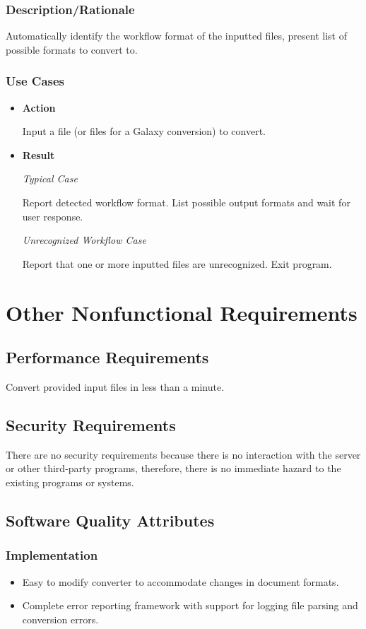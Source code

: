 \documentclass[12pt]{article}
\begin{document}
\subsubsection{Description/Rationale} Automatically identify the workflow format of the inputted files, present list of possible formats to convert to.

\subsubsection{Use Cases}
\begin{itemize}
\item \textbf{Action}

Input a file (or files for a Galaxy conversion) to convert.

\item \textbf{Result}

\textit{Typical Case}

Report detected workflow format. List possible output formats and wait for user response.

\textit{Unrecognized Workflow Case}

Report that one or more inputted files are unrecognized. Exit program.
\end{itemize}





\section{Other Nonfunctional Requirements}
\subsection{Performance Requirements}
Convert provided input files in less than a minute.

\subsection{Security Requirements}
There are no security requirements because there is no interaction with the server or other third-party programs, therefore, there is no immediate hazard to the existing programs or systems.

\subsection{Software Quality Attributes}
\subsubsection{Implementation}
\begin{itemize}
\item Easy to modify converter to accommodate changes in document formats.
\item Complete error reporting framework with support for logging file parsing and conversion errors.
\end{itemize}
\end{document}

